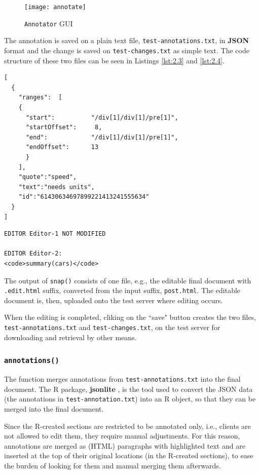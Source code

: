 \documentclass[a4paper, 12pt]{report}
\begin{document}
\begin{figure}[h]
\texttt{[image: annotate]}
\caption{\texttt{Annotator} GUI}
\label{fig:2.4}
\end{figure}

The annotation is saved on a plain text file, \texttt{test-annotations.txt}, in \textbf{JSON} \citep{json} format and the change is saved on \texttt{test-changes.txt} as simple text. The code structure of these two files can be seen in Listings \ref{lst:2.3} and \ref{lst:2.4}.

\begin{lstlisting}[numbers=none, caption={\texttt{test-annotations.txt}}, label={lst:2.3}]
[
  {
    "ranges":  [
    {
      "start":          "/div[1]/div[1]/pre[1]",
      "startOffset":     8,
      "end":            "/div[1]/div[1]/pre[1]",
      "endOffset":      13
      }
    ],
    "quote":"speed",
    "text":"needs units",
    "id":"61430634697899221413241555634"
  }
]
\end{lstlisting}

\begin{lstlisting}[numbers=none, caption={\texttt{test-changes.txt}}, label={lst:2.4}]
EDITOR Editor-1 NOT MODIFIED

EDITOR Editor-2:
<code>summary(cars)</code>
\end{lstlisting}

The output of \texttt{snap()} consists of one file, e.g., the editable final document with \texttt{.edit.html} suffix, converted from the input suffix, \texttt{post.html}. The editable document is, then, uploaded onto the test server where editing occurs.

When the editing is completed, cliking on the ``save" button creates the two files, \texttt{test-annotations.txt} and \texttt{test-changes.txt}, on the test server for downloading and retrieval by other means.

\subsubsection*{\texttt{annotations()}}
The function merges annotations from \texttt{test-annotations.txt} into the final document. The R package, \textbf{jsonlite} \citep{jsonlite}, is the tool used to convert the JSON data (the annotations in \texttt{test-annotation.txt}) into an R object, so that they can be merged into the final document.

Since the R-created sections are restricted to be annotated only, i.e., clients are not allowed to edit them, they require manual adjustments. For this reason, annotations are merged as (HTML) paragraphs with highlighted text and are inserted at the top of their original locations (in the R-created sections), to ease the burden of looking for them and manual merging them afterwards.
\end{document}
